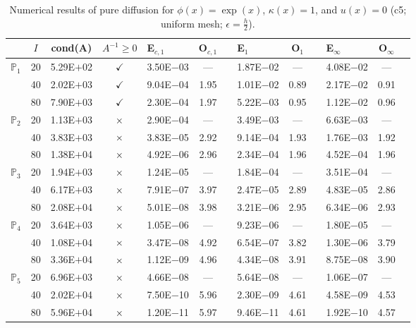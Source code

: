 \begin{table}[H]
\centering
\caption{Numerical results of pure diffusion for $\phi(x)=\exp(x)$, $\kappa(x)=1$, and $u(x)=0$ (c5; uniform mesh; $\epsilon=\frac{h}{2}$).}
\begin{tabular}{@{}l c c c l c c l c c l c c@{}}
\toprule
 & $I$ & cond(A) & $A^{-1}\geq 0$ &  E$_{c,1}$ & O$_{c,1}$ && E$_1$ & O$_1$ && E$_{\infty}$ & O$_{\infty}$\\
\midrule
\multirow{3}{*}{$\mathbb{P}_{1}$}
 & 20 & 5.29E$+$02 & $\checkmark$ & 3.50E$-$03 & --- && 1.87E$-$02 & --- && 4.08E$-$02 & ---\\
 & 40 & 2.02E$+$03 & $\checkmark$ & 9.04E$-$04 & 1.95 && 1.01E$-$02 & 0.89 && 2.17E$-$02 & 0.91\\
 & 80 & 7.90E$+$03 & $\checkmark$ & 2.30E$-$04 & 1.97 && 5.22E$-$03 & 0.95 && 1.12E$-$02 & 0.96\\
\midrule
\multirow{3}{*}{$\mathbb{P}_{2}$}
 & 20 & 1.13E$+$03 & $\times$ & 2.90E$-$04 & --- && 3.49E$-$03 & --- && 6.63E$-$03 & ---\\
 & 40 & 3.83E$+$03 & $\times$ & 3.83E$-$05 & 2.92 && 9.14E$-$04 & 1.93 && 1.76E$-$03 & 1.92\\
 & 80 & 1.38E$+$04 & $\times$ & 4.92E$-$06 & 2.96 && 2.34E$-$04 & 1.96 && 4.52E$-$04 & 1.96\\
\midrule
\multirow{3}{*}{$\mathbb{P}_{3}$}
 & 20 & 1.94E$+$03 & $\times$ & 1.24E$-$05 & --- && 1.84E$-$04 & --- && 3.51E$-$04 & ---\\
 & 40 & 6.17E$+$03 & $\times$ & 7.91E$-$07 & 3.97 && 2.47E$-$05 & 2.89 && 4.83E$-$05 & 2.86\\
 & 80 & 2.08E$+$04 & $\times$ & 5.01E$-$08 & 3.98 && 3.21E$-$06 & 2.95 && 6.34E$-$06 & 2.93\\
\midrule
\multirow{3}{*}{$\mathbb{P}_{4}$}
 & 20 & 3.64E$+$03 & $\times$ & 1.05E$-$06 & --- && 9.23E$-$06 & --- && 1.80E$-$05 & ---\\
 & 40 & 1.08E$+$04 & $\times$ & 3.47E$-$08 & 4.92 && 6.54E$-$07 & 3.82 && 1.30E$-$06 & 3.79\\
 & 80 & 3.36E$+$04 & $\times$ & 1.12E$-$09 & 4.96 && 4.34E$-$08 & 3.91 && 8.75E$-$08 & 3.90\\
\midrule
\multirow{3}{*}{$\mathbb{P}_{5}$}
 & 20 & 6.96E$+$03 & $\times$ & 4.66E$-$08 & --- && 5.64E$-$08 & --- && 1.06E$-$07 & ---\\
 & 40 & 2.02E$+$04 & $\times$ & 7.50E$-$10 & 5.96 && 2.30E$-$09 & 4.61 && 4.58E$-$09 & 4.53\\
 & 80 & 5.96E$+$04 & $\times$ & 1.20E$-$11 & 5.97 && 9.46E$-$11 & 4.61 && 1.92E$-$10 & 4.57\\
\bottomrule
\end{tabular}
\end{table}